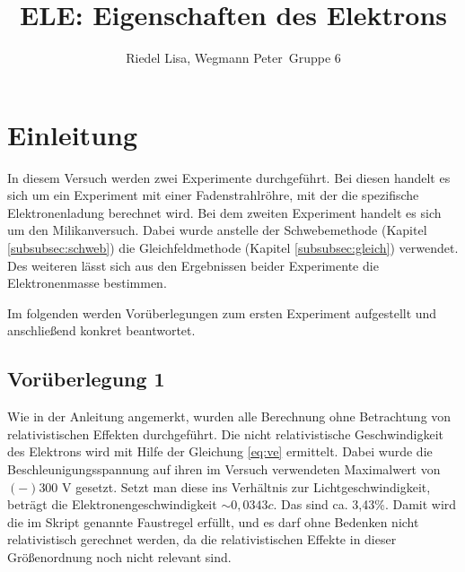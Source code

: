 \documentclass[a4paper,usenatbib]{aspdoc}
\title[]{ELE: Eigenschaften des Elektrons}
\author[]{
    Riedel Lisa, Wegmann Peter
    \newauthor
    \,Gruppe 6
}
\begin{document}
    \label{firstpage}
    \pagerange{\pageref{firstpage}--\pageref{lastpage}}
    \maketitle
  
    
    \section{Einleitung} 
          In diesem Versuch werden zwei Experimente durchgeführt. Bei diesen handelt es sich um ein Experiment mit einer Fadenstrahlröhre, mit der die spezifische Elektronenladung berechnet wird. Bei dem zweiten Experiment handelt es sich um den Milikanversuch. Dabei wurde anstelle der Schwebemethode (Kapitel \ref{subsubsec:schweb}) die Gleichfeldmethode (Kapitel \ref{subsubsec:gleich}) verwendet. Des weiteren lässt sich aus den Ergebnissen beider Experimente die Elektronenmasse bestimmen.
        
        \noindent Im folgenden werden Vorüberlegungen zum ersten Experiment aufgestellt und anschließend konkret beantwortet.
  
            \subsection{Vorüberlegung 1}
                Wie in der Anleitung angemerkt, wurden alle Berechnung ohne Betrachtung von relativistischen Effekten durchgeführt. Die nicht relativistische Geschwindigkeit des Elektrons wird mit Hilfe der Gleichung \ref{eq:ve} ermittelt. Dabei wurde die Beschleunigungsspannung auf ihren im Versuch verwendeten Maximalwert von  $ (-)300$ V gesetzt. Setzt man diese ins Verhältnis zur Lichtgeschwindigkeit, beträgt die Elektronengeschwindigkeit $\sim 0,0343c$. Das sind ca. 3,43\%. Damit wird die im Skript genannte Faustregel erfüllt, und es darf ohne Bedenken nicht relativistisch gerechnet werden, da die relativistischen Effekte in dieser Größenordnung noch nicht relevant sind.\\          
               
\end{document}
